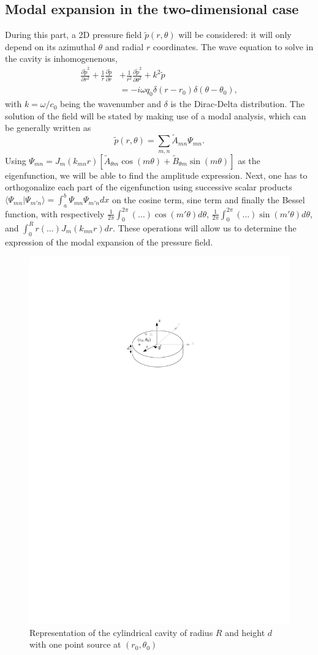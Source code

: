 \documentclass[%
 reprint,
 amsmath,amssymb,
 aip,
]{revtex4-1}
\begin{document}
\subsection{Modal expansion in the two-dimensional case}
During this part, a 2D pressure field $\tilde{p}(r, \theta)$ will be considered: it will only depend on its azimuthal $\theta$ and radial $r$ coordinates. The wave equation to solve in the cavity is inhomogenenous,
\begin{equation}
    \begin{split}
        \frac{\partial \tilde{p}^2}{\partial r^2} + \frac{1}{r} \frac{\partial \tilde{p}}{\partial r} &+ \frac{1}{r^2} \frac{\partial \tilde{p}^2}{\partial \theta^2} + k^2 \tilde{p}\\ &= -i \omega q_0 \delta(r - r_0) \delta(\theta - \theta_0),
    \end{split}
\end{equation}
with $k = \omega/c_0$ being the wavenumber and $\delta$ is the Dirac-Delta distribution. The solution of the field will be stated by making use of a modal analysis, which can be generally written as 
\begin{equation}
    \tilde{p}(r, \theta) = \sum_{m,n} \tilde{A}_{mn} \Psi_{mn}.
\end{equation}
Using $\Psi_{mn} = J_m (k_{mn}r)\left[ \tilde{A}_{\theta m} \cos(m \theta) + \tilde{B}_{\theta m} \sin(m \theta) \right]$ as the eigenfunction, we will be able to find the amplitude expression. Next, one has to orthogonalize each part of the eigenfunction using successive scalar products $\langle \Psi_{mn} | \Psi_{m'n} \rangle = \int_a^b  \Psi_{mn}\Psi_{m'n} dx $ on the cosine term, sine term and finally the Bessel function, with respectively $\frac{1}{2\pi}\int_0^{2\pi}(\ldots)\cos(m'\theta) d\theta$, $\frac{1}{2\pi}\int_0^{2\pi}(\ldots)\sin(m'\theta) d\theta$, and $\int_0^R r (\ldots) J_m(k_{mn}r)dr$. These operations will allow us to determine the expression of the modal expansion of the pressure field.\\



\begin{figure}
    \centering
    \includegraphics[width=.35\textwidth]{figures/schema.pdf}
    \caption{Representation of the cylindrical cavity of radius $R$ and height $d$ with one point source at $(r_0, \theta_0)$}
    \label{fig:schema}
\end{figure}
\end{document}
